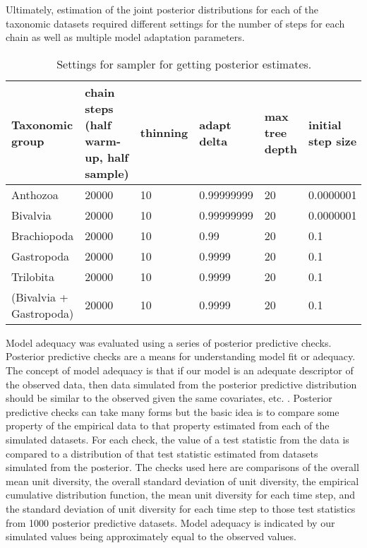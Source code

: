 \documentclass[12pt,letterpaper]{article}
\begin{document}
Ultimately, estimation of the joint posterior distributions for each of the taxonomic datasets required different settings for the number of steps for each chain as well as multiple model adaptation parameters.

\begin{table}
  \centering
  \begin{tabular}{ l l l l l l }
    Taxonomic group & chain steps (half warm-up, half sample) & thinning & adapt delta & max tree depth & initial step size \\
    \hline
    Anthozoa & 20000 & 10 & 0.99999999 & 20 & 0.0000001 \\
    Bivalvia & 20000 & 10 & 0.99999999 & 20 & 0.0000001 \\
    Brachiopoda & 20000 & 10 & 0.99 & 20 & 0.1 \\
    Gastropoda & 20000 & 10 & 0.9999 & 20 & 0.1 \\
    Trilobita & 20000 & 10 & 0.9999 & 20 & 0.1 \\
    (Bivalvia + Gastropoda) & 20000 & 10 & 0.9999 & 20 & 0.1 \\
  \end{tabular}
  \caption{Settings for sampler for getting posterior estimates.}
  \label{tab:<+label+>}
\end{table}


Model adequacy was evaluated using a series of posterior predictive checks. Posterior predictive checks are a means for understanding model fit or adequacy. The concept of model adequacy is that if our model is an adequate descriptor of the observed data, then data simulated from the posterior predictive distribution should be similar to the observed given the same covariates, etc. \citep{Gelman2013d}. Posterior predictive checks can take many forms but the basic idea is to compare some property of the empirical data to that property estimated from each of the simulated datasets. For each check, the value of a test statistic from the data is compared to a distribution of that test statistic estimated from datasets simulated from the posterior. The checks used here are comparisons of the overall mean unit diversity, the overall standard deviation of unit diversity, the empirical cumulative distribution function, the mean unit diversity for each time step, and the standard deviation of unit diversity for each time step to those test statistics from 1000 posterior predictive datasets. Model adequacy is indicated by our simulated values being approximately equal to the observed values.
\end{document}
